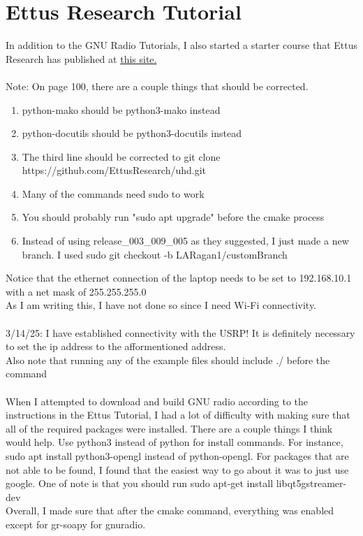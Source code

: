 \documentclass{article}
\begin{document}
\section{Ettus Research Tutorial}
In addition to the GNU Radio Tutorials, I also started a starter course that Ettus 
Research has published at \href{https://kb.ettus.com/images/4/47/Workshop_GnuRadio_Slides_20190507.pdf}{this site.}
\\ \\
Note: On page 100, there are a couple things that should be corrected.
\begin{enumerate}
    \item python-mako should be python3-mako instead 
    \item python-docutils should be python3-docutils instead 
    \item The third line should be corrected to git clone https://github.com/EttusResearch/uhd.git 
    \item Many of the commands need sudo to work
    \item You should probably run "sudo apt upgrade" before the cmake process 
    \item Instead of using release\_003\_009\_005 as they suggested, I just made a new branch. I used sudo git checkout -b LARagan1/customBranch
\end{enumerate}
Notice that the ethernet connection of the laptop needs to be set to 192.168.10.1 with a net 
mask of 255.255.255.0 \\
As I am writing this, I have not done so since I need Wi-Fi connectivity.
\\ \\
3/14/25: I have established connectivity with the USRP! It is definitely necessary to set the ip address
to the afformentioned address. \\
Also note that running any of the example files should include ./ before the command 
\\ \\
When I attempted to download and build GNU radio according to the instructions in the Ettus Tutorial,
I had a lot of difficulty with making sure that all of the required packages were installed. 
There are a couple things I think would help. Use python3 instead of python for install commands.
For instance, sudo apt install python3-opengl instead of python-opengl. For packages that are 
not able to be found, I found that the easiest way to go about it was to just use google. One of 
note is that you should run sudo apt-get install libqt5gstreamer-dev \\
Overall, I made sure that after the cmake command, everything was enabled except for gr-soapy 
for gnuradio.
\\ \\
\end{document}
